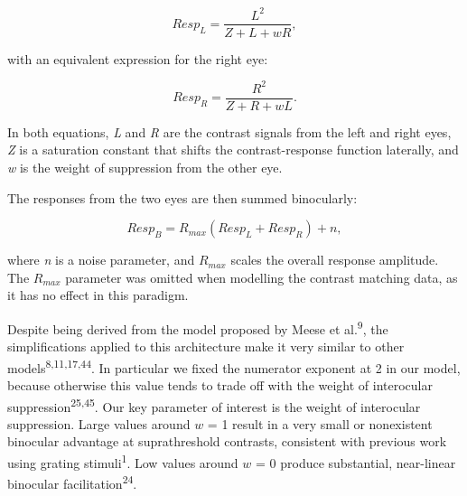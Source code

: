 \documentclass[
]{article}
\begin{document}
\begin{equation}
\label{eq:respL}
Resp_L = \frac{L^2}{Z + L + wR},
\end{equation}

with an equivalent expression for the right eye:

\begin{equation}
\label{eq:respR}
Resp_R = \frac{R^2}{Z + R + wL}.
\end{equation}

In both equations, \emph{L} and \emph{R} are the contrast signals from the left and right eyes, \emph{Z} is a saturation constant that shifts the contrast-response function laterally, and \emph{w} is the weight of suppression from the other eye.

The responses from the two eyes are then summed binocularly:

\begin{equation}
\label{eq:respB}
Resp_B = R_{max}(Resp_L + Resp_R) + n,
\end{equation}

where \emph{n} is a noise parameter, and \(R_{max}\) scales the overall response amplitude. The \(R_{max}\) parameter was omitted when modelling the contrast matching data, as it has no effect in this paradigm.

Despite being derived from the model proposed by Meese et al.\textsuperscript{9}, the simplifications applied to this architecture make it very similar to other models\textsuperscript{8,11,17,44}. In particular we fixed the numerator exponent at 2 in our model, because otherwise this value tends to trade off with the weight of interocular suppression\textsuperscript{25,45}. Our key parameter of interest is the weight of interocular suppression. Large values around \(w\) = 1 result in a very small or nonexistent binocular advantage at suprathreshold contrasts, consistent with previous work using grating stimuli\textsuperscript{1}. Low values around \(w\) = 0 produce substantial, near-linear binocular facilitation\textsuperscript{24}.
\end{document}
